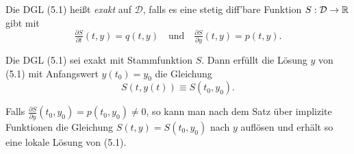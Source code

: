 \documentclass{cheat-sheet}
\newcommand{\D}{\mathcal{D}}
\begin{document}
\begin{defn}
  Die DGL (5.1) heißt \emph{exakt} auf $\D$, falls es eine stetig diff'bare Funktion $S : \D \to \R$ gibt mit
  \[
    \tfrac{\partial S}{\partial t}(t, y) = q(t, y)
    \quad \text{und} \quad
    \tfrac{\partial S}{\partial y}(t, y) = p(t, y).
  \]
\end{defn}

\begin{satz}
  Die DGL (5.1) sei exakt mit Stammfunktion $S$. Dann erfüllt die Lösung $y$ von (5.1) mit Anfangswert $y(t_0) = y_0$ die Gleichung
  \[ S(t, y(t)) \equiv S(t_0, y_0). \]
\end{satz}

\begin{bem}
  Falls $\tfrac{\partial S}{\partial y}(t_0, y_0) = p(t_0, y_0) \not= 0$, so kann man nach dem Satz über implizite Funktionen die Gleichung $S(t, y) = S(t_0, y_0)$ nach $y$ auflösen und erhält so eine lokale Lösung von (5.1).
\end{bem}

\end{document}
